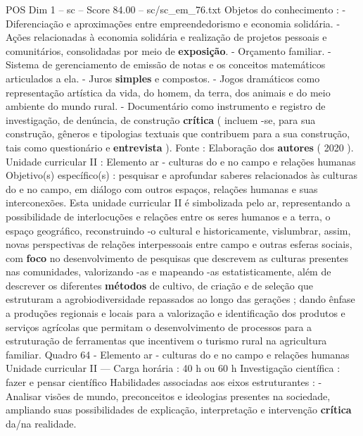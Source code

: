 \begin{textsample}{POS Dim 1 – sc – Score 84.00 – sc/sc\_em\_76.txt}
Objetos do conhecimento : - Diferenciação e aproximações entre empreendedorismo e economia solidária. - Ações relacionadas à economia solidária e realização de projetos pessoais e comunitários, consolidadas por meio de \textbf{exposição}. - Orçamento familiar. - Sistema de gerenciamento de emissão de notas e os conceitos matemáticos articulados a ela. - Juros \textbf{simples} e compostos. - Jogos dramáticos como representação artística da vida, do homem, da terra, dos animais e do meio ambiente do mundo rural. - Documentário como instrumento e registro de investigação, de denúncia, de construção \textbf{crítica} ( incluem -se, para sua construção, gêneros e tipologias textuais que contribuem para a sua construção, tais como questionário e \textbf{entrevista} ).
Fonte : Elaboração dos \textbf{autores} ( 2020 ).
Unidade curricular II : Elemento ar - culturas do e no campo e relações humanas Objetivo(s) específico(s) : pesquisar e aprofundar saberes relacionados às culturas do e no campo, em diálogo com outros espaços, relações humanas e suas interconexões.
Esta unidade curricular II é simbolizada pelo ar, representando a possibilidade de interlocuções e relações entre os seres humanos e a terra, o espaço geográfico, reconstruindo -o cultural e historicamente, vislumbrar, assim, novas perspectivas de relações interpessoais entre campo e outras esferas sociais, com \textbf{foco} no desenvolvimento de pesquisas que descrevem as culturas presentes nas comunidades, valorizando -as e mapeando -as estatisticamente, além de descrever os diferentes \textbf{métodos} de cultivo, de criação e de seleção que estruturam a agrobiodiversidade repassados ao longo das gerações ; dando ênfase a produções regionais e locais para a valorização e identificação dos produtos e serviços agrícolas que permitam o desenvolvimento de processos para a estruturação de ferramentas que incentivem o turismo rural na agricultura familiar.
Quadro 64 - Elemento ar - culturas do e no campo e relações humanas Unidade curricular II — Carga horária : 40 h ou 60 h Investigação científica : fazer e pensar científico Habilidades associadas aos eixos estruturantes : - Analisar visões de mundo, preconceitos e ideologias presentes na sociedade, ampliando suas possibilidades de explicação, interpretação e intervenção \textbf{crítica} da/na realidade.

\end{textsample}
